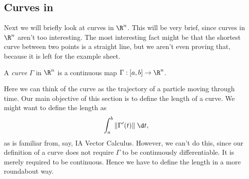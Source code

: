 \documentclass[a4paper]{article}
\begin{document}
\subsection{Curves in }
Next we will briefly look at curves in $\R^n$. This will be very brief, since curves in $\R^n$ aren't too interesting. The most interesting fact might be that the shortest curve between two points is a straight line, but we aren't even proving that, because it is left for the example sheet.

\begin{defi}[Curve]
  A \emph{curve} $\Gamma$ in $\R^n$ is a continuous map $\Gamma: [a, b] \to \R^n$.
\end{defi}
Here we can think of the curve as the trajectory of a particle moving through time. Our main objective of this section is to define the length of a curve. We might want to define the length as
\[
  \int_a^b \|\Gamma'(t)\|\;\d t,
\]
as is familiar from, say, IA Vector Calculus. However, we can't do this, since our definition of a curve does not require $\Gamma$ to be continuously differentiable. It is merely required to be continuous. Hence we have to define the length in a more roundabout way.
\end{document}
